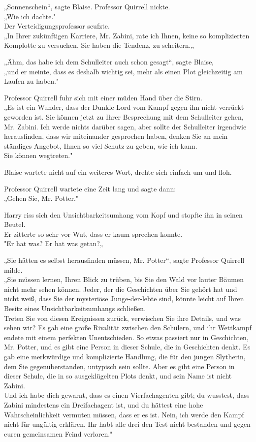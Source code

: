 {„Sonnenschein“, sagte Blaise. Professor Quirrell nickte.\\ „Wie ich dachte."\\ Der Verteidigungsprofessor seufzte.\\ „In Ihrer zukünftigen Karriere, Mr. Zabini, rate ich Ihnen, keine so komplizierten Komplotte zu versuchen. Sie haben die Tendenz, zu scheitern.„

„Ähm, das habe ich dem Schulleiter auch schon gesagt“, sagte Blaise,\\ „und er meinte, dass es deshalb wichtig sei, mehr als einen Plot gleichzeitig am Laufen zu haben."

Professor Quirrell fuhr sich mit einer müden Hand über die Stirn.\\ „Es ist ein Wunder, dass der Dunkle Lord vom Kampf gegen ihn nicht verrückt geworden ist. Sie können jetzt zu Ihrer Besprechung mit dem Schulleiter gehen, Mr. Zabini. Ich werde nichts darüber sagen, aber sollte der Schulleiter irgendwie herausfinden, dass wir miteinander gesprochen haben, denken Sie an mein ständiges Angebot, Ihnen so viel Schutz zu geben, wie ich kann.\\ Sie können wegtreten."

Blaise wartete nicht auf ein weiteres Wort, drehte sich einfach um und floh.

Professor Quirrell wartete eine Zeit lang und sagte dann:\\ „Gehen Sie, Mr. Potter."

Harry riss sich den Unsichtbarkeitsumhang vom Kopf und stopfte ihn in seinen Beutel.\\ Er zitterte so sehr vor Wut, dass er kaum sprechen konnte.\\ "Er hat was? Er hat was getan?„

„Sie hätten es selbst herausfinden müssen, Mr. Potter“, sagte Professor Quirrell milde.\\ „Sie müssen lernen, Ihren Blick zu trüben, bis Sie den Wald vor lauter Bäumen nicht mehr sehen können. Jeder, der die Geschichten über Sie gehört hat und nicht weiß, dass Sie der mysteriöse Junge-der-lebte sind, könnte leicht auf Ihren Besitz eines Unsichtbarkeitsumhangs schließen.\\ Treten Sie von diesen Ereignissen zurück, verwischen Sie ihre Details, und was sehen wir? Es gab eine große Rivalität zwischen den Schülern, und ihr Wettkampf endete mit einem perfekten Unentschieden. So etwas passiert nur in Geschichten, Mr. Potter, und es gibt eine Person in dieser Schule, die in Geschichten denkt. Es gab eine merkwürdige und komplizierte Handlung, die für den jungen Slytherin, dem Sie gegenüberstanden, untypisch sein sollte. Aber es gibt eine Person in dieser Schule, die in so ausgeklügelten Plots denkt, und sein Name ist nicht Zabini.\\ Und ich habe dich gewarnt, dass es einen Vierfachagenten gibt; du wusstest, dass Zabini mindestens ein Dreifachagent ist, und du hättest eine hohe Wahrscheinlichkeit vermuten müssen, dass er es ist. Nein, ich werde den Kampf nicht für ungültig erklären. Ihr habt alle drei den Test nicht bestanden und gegen euren gemeinsamen Feind verloren."

}
